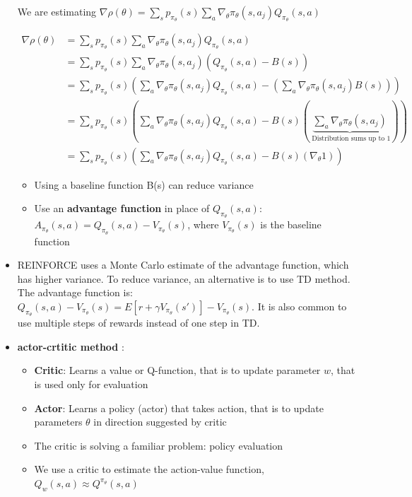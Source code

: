 \documentclass[12pt]{article}
\begin{document}
\begin{itemize}
  We are estimating $\nabla \rho (\theta) = \sum_{s}{} p_{\pi_\theta} (s) \sum_{a}^{} \nabla_\theta \pi_\theta(s,a_j) Q_{\pi_\theta}(s, a)$
 
 \begin{equation}
\begin{split}
\nabla \rho (\theta) & = \sum_{s}{} p_{\pi_\theta} (s) \sum_{a}^{} \nabla_\theta \pi_\theta(s,a_j) Q_{\pi_\theta}(s, a) \\
 & =  \sum_{s}{} p_{\pi_\theta} (s) \sum_{a}^{} \nabla_\theta \pi_\theta(s,a_j) (Q_{\pi_\theta}(s, a) - B(s))\\
 & =  \sum_{s}{} p_{\pi_\theta} (s) (\sum_{a}^{} \nabla_\theta \pi_\theta(s,a_j) Q_{\pi_\theta}(s, a) - (\sum_{a}^{} \nabla_\theta \pi_\theta(s,a_j)B(s)))\\
  & =  \sum_{s}{} p_{\pi_\theta} (s) (\sum_{a}^{} \nabla_\theta \pi_\theta(s,a_j) Q_{\pi_\theta}(s, a) - B(s)(\underbrace{\sum_{a}^{} \nabla_\theta \pi_\theta(s,a_j)}_{\text{ Distribution sums up to 1}}))\\
  & = \sum_{s}{} p_{\pi_\theta} (s) (\sum_{a}^{} \nabla_\theta \pi_\theta(s,a_j) Q_{\pi_\theta}(s, a) - B(s)(\nabla_\theta 1))
\end{split}
\end{equation}
 
  \begin{itemize}
  \item Using a baseline function B(s) can reduce variance 
  \item Use an \textbf{advantage function} in place of $Q_{\pi_\theta} (s, a)$: $A_{\pi_\theta} (s, a) = Q_{\pi_\theta} (s, a) - V_{\pi_\theta} (s)$, where  $V_{\pi_\theta} (s)$ is the baseline function
  \end{itemize}
 \item REINFORCE uses a Monte Carlo estimate of the advantage function, which has higher variance. To reduce variance, an alternative is to use TD method. The advantage function is: 
  	$Q_{\pi_\theta} (s, a) - V_{\pi_\theta} (s) = E[r + \gamma V_{\pi_\theta}(s')] - V_{\pi_\theta}(s)$. It is also common to use multiple steps of rewards instead of one step in TD. 
\item \textbf{actor-crtitic method} : 
   \begin{itemize}
    \item \textbf{Critic}: Learns a value or Q-function, that is to update parameter $w$, that is used only for evaluation
  \item \textbf{Actor}: Learns a policy (actor) that takes action, that is to update parameters $\theta$ in direction suggested by critic
   \item The critic is solving a familiar problem: policy evaluation
  \item We use a critic to estimate the action-value function, $Q_w (s, a) \approx Q^{\pi_\theta} (s, a)$
  \end{itemize}
 
 \end{itemize}
\end{document}

